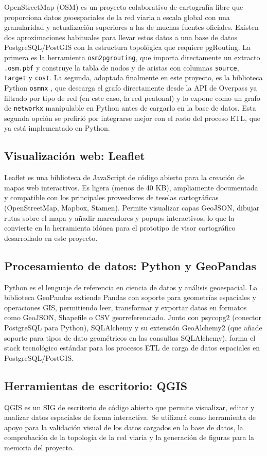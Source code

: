 OpenStreetMap (OSM) es un proyecto colaborativo de cartografía libre que proporciona datos geoespaciales de la red viaria a escala global con una granularidad y actualización superiores a las de muchas fuentes oficiales. Existen dos aproximaciones habituales para llevar estos datos a una base de datos PostgreSQL/PostGIS con la estructura topológica que requiere pgRouting. La primera es la herramienta \texttt{osm2pgrouting}, que importa directamente un extracto \texttt{.osm.pbf} y construye la tabla de nodos y de aristas con columnas \texttt{source}, \texttt{target} y \texttt{cost}. La segunda, adoptada finalmente en este proyecto, es la biblioteca Python \texttt{osmnx} \cite{boeing2017}, que descarga el grafo directamente desde la API de Overpass ya filtrado por tipo de red (en este caso, la red peatonal) y lo expone como un grafo de \texttt{networkx} manipulable en Python antes de cargarlo en la base de datos. Esta segunda opción se prefirió por integrarse mejor con el resto del proceso ETL, que ya está implementado en Python.

\subsection{Visualización web: Leaflet}
\label{subsec:leaflet}

Leaflet es una biblioteca de JavaScript de código abierto para la creación de mapas web interactivos. Es ligera (menos de 40 KB), ampliamente documentada y compatible con los principales proveedores de teselas cartográficas (OpenStreetMap, Mapbox, Stamen). Permite visualizar capas GeoJSON, dibujar rutas sobre el mapa y añadir marcadores y popups interactivos, lo que la convierte en la herramienta idónea para el prototipo de visor cartográfico desarrollado en este proyecto.

\subsection{Procesamiento de datos: Python y GeoPandas}
\label{subsec:python}

Python es el lenguaje de referencia en ciencia de datos y análisis geoespacial. La biblioteca GeoPandas extiende Pandas con soporte para geometrías espaciales y operaciones GIS, permitiendo leer, transformar y exportar datos en formatos como GeoJSON, Shapefile o CSV georreferenciado. Junto con psycopg2 (conector PostgreSQL para Python), SQLAlchemy y su extensión GeoAlchemy2 (que añade soporte para tipos de dato geométricos en las consultas SQLAlchemy), forma el stack tecnológico estándar para los procesos ETL de carga de datos espaciales en PostgreSQL/PostGIS.

\subsection{Herramientas de escritorio: QGIS}
\label{subsec:qgis}

QGIS es un SIG de escritorio de código abierto que permite visualizar, editar y analizar datos espaciales de forma interactiva. Se utilizará como herramienta de apoyo para la validación visual de los datos cargados en la base de datos, la comprobación de la topología de la red viaria y la generación de figuras para la memoria del proyecto.
